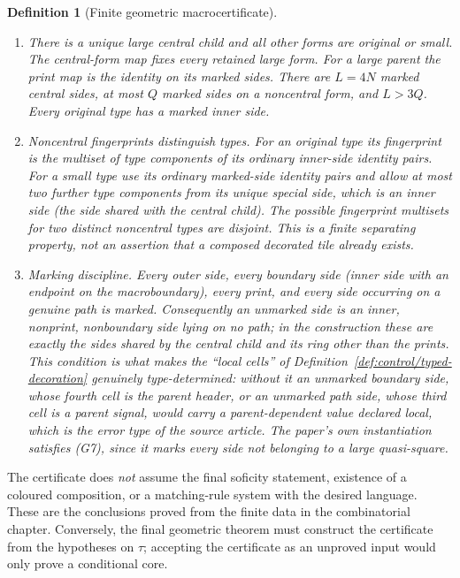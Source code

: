 \documentclass[11pt,a4paper]{article}
\newtheorem{definition}{Definition}[section]
\theoremstyle{remark}
\begin{document}
\begin{definition}[Finite geometric macrocertificate]
\begin{enumerate}
fifth path and all five paths of unmarked parent sides are singleton
ports, disjoint from genuine paths.  This is a finite routing certificate.
\item[(G5)] There is a unique large central child and all other forms are
original or small.  The central-form map fixes every retained large form.
For a large parent the print map is the identity on its marked sides.
There are $L=4N$ marked central sides, at most $Q$ marked sides on a
noncentral form, and $L>3Q$.  Every original type has a marked inner side.
\item[(G6)] Noncentral fingerprints distinguish types.  For an original
type its fingerprint is the multiset of type components of its ordinary
inner-side identity pairs.  For a small type use its ordinary marked-side
identity pairs and allow at most two further type components from its
unique special side, which is an inner side (the side shared with the
central child).  The possible fingerprint multisets for two
distinct noncentral types are disjoint.  This is a finite separating
property, not an assertion that a composed decorated tile already exists.
\item[(G7)] Marking discipline.  Every outer side, every boundary side
(inner side with an endpoint on the macroboundary), every print, and every
side occurring on a genuine path is marked.  Consequently an unmarked side
is an inner, nonprint, nonboundary side lying on no path; in the
construction these are exactly the sides shared by the central child and
its ring other than the prints.  This condition is what makes the
``local cells'' of Definition~\ref{def:control/typed-decoration} genuinely
type-determined: without it an unmarked boundary side, whose fourth cell
is the parent header, or an unmarked path side, whose third cell is a
parent signal, would carry a parent-dependent value declared local, which
is the error type of the source article.  The paper's own instantiation
satisfies (G7), since it marks every side not belonging to a large
quasi-square.
\end{enumerate}
\end{definition}

The certificate does \emph{not} assume the final soficity statement,
existence of a coloured composition, or a matching-rule system with the
desired language.  These are the conclusions proved from the finite data
in the combinatorial chapter.  Conversely, the final geometric theorem
must construct the certificate from the hypotheses on $\tau$; accepting
the certificate as an unproved input would only prove a conditional core.
\end{document}
